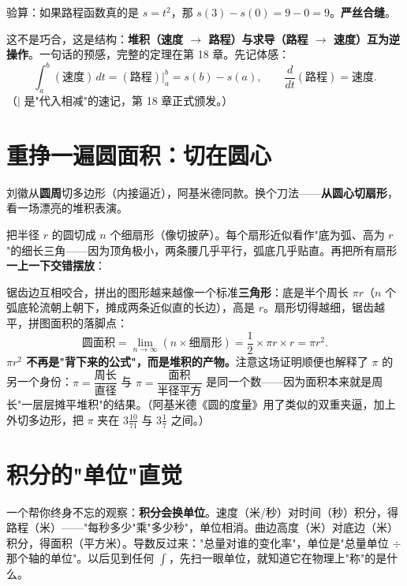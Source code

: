 验算：如果路程函数真的是 $s = t^2$，那 $s(3) - s(0) = 9 - 0 = 9$。\textbf{严丝合缝}。

这不是巧合，这是结构：\textbf{堆积（速度 $\to$ 路程）与求导（路程 $\to$ 速度）互为逆操作}。一句话的预感，完整的定理在第 18 章。先记体感：
\[
\int_a^b (\text{速度})\,dt = (\text{路程})\big|_a^b = s(b) - s(a), \qquad
\frac{d}{dt}(\text{路程}) = \text{速度} .
\]
（$\big|$ 是"代入相减"的速记，第 18 章正式颁发。）

\section{重挣一遍圆面积：切在圆心}

刘徽从\textbf{圆周}切多边形（内接逼近），阿基米德同款。换个刀法——\textbf{从圆心切扇形}，看一场漂亮的堆积表演。

把半径 $r$ 的圆切成 $n$ 个细扇形（像切披萨）。每个扇形近似看作"底为弧、高为 $r$"的细长三角——因为顶角极小，两条腰几乎平行，弧底几乎贴直。再把所有扇形\textbf{一上一下交错摆放}：


锯齿边互相咬合，拼出的图形越来越像一个标准\textbf{三角形}：底是半个周长 $\pi r$（$n$ 个弧底轮流朝上朝下，摊成两条近似直的长边），高是 $r$。扇形切得越细，锯齿越平，拼图面积的落脚点：
\[
\text{圆面积} = \lim_{n\to\infty}\left(n\times\text{细扇形}\right) = \frac12 \times \pi r \times r = \pi r^2 .
\]
\textbf{$\pi r^2$ 不再是"背下来的公式"，而是堆积的产物。}注意这场证明顺便也解释了 $\pi$ 的另一个身份：$\pi = \dfrac{\text{周长}}{\text{直径}}$ 与 $\pi = \dfrac{\text{面积}}{\text{半径平方}}$ 是同一个数——因为面积本来就是周长"一层层摊平堆积"的结果。（阿基米德《圆的度量》用了类似的双重夹逼，加上外切多边形，把 $\pi$ 夹在 $3\tfrac{10}{71}$ 与 $3\tfrac17$ 之间。）

\section{积分的"单位"直觉}

一个帮你终身不忘的观察：\textbf{积分会换单位}。速度（米/秒）对时间（秒）积分，得路程（米）——"每秒多少"乘"多少秒"，单位相消。曲边高度（米）对底边（米）积分，得面积（平方米）。导数反过来："总量对谁的变化率"，单位是"总量单位 $\div$ 那个轴的单位"。以后见到任何 $\int$，先扫一眼单位，就知道它在物理上"称"的是什么。

